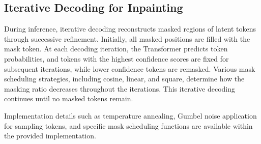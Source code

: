 \subsection{Iterative Decoding for Inpainting}

During inference, iterative decoding reconstructs masked regions of latent tokens through successive refinement.
Initially, all masked positions are filled with the mask token.
At each decoding iteration, the Transformer predicts token probabilities, and tokens with the highest confidence scores are fixed for subsequent iterations, while lower confidence tokens are remasked.
Various mask scheduling strategies, including cosine, linear, and square, determine how the masking ratio decreases throughout the iterations.
This iterative decoding continues until no masked tokens remain.

Implementation details such as temperature annealing, Gumbel noise application for sampling tokens, and specific mask scheduling functions are available within the provided implementation.

\inputminted[firstline=33, lastline=93, highlightlines={47,61,63-68}]{python}{../inpainting.py}

\inputminted[firstline=71, lastline=109]{python}{../models/VQGAN_Transformer.py}
